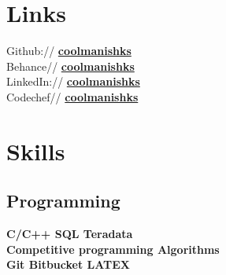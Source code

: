 \documentclass[a4paper]{deedy-resume} %
\begin{document}
\begin{minipage}[t]{0.33\textwidth}
\section{Links} 

Github:// \href{https://github.com/coolmanishks}{\bf coolmanishks} \\
Behance// \href{https://www.behance.net/coolmanishks}{\bf coolmanishks}\\
LinkedIn:// \href{https://www.linkedin.com/in/coolmanishks}{\bf coolmanishks} \\
Codechef// \href{https://www.codechef.com/users/coolmanishks}{\bf coolmanishks}\\

\sectionspace %








\section{Skills}

\subsection{Programming}
\textbf{C/C++ \textbullet{} SQL \textbullet{} Teradata  \\
Competitive programming  \textbullet{}Algorithms \\
Git \textbullet Bitbucket \textbullet LATEX }


\end{minipage}
\end{document}
